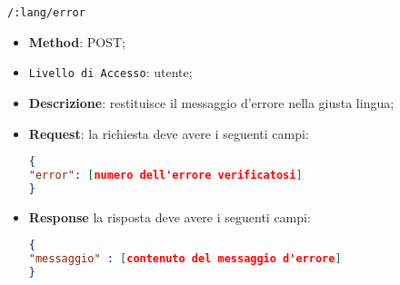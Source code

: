 	\item \texttt{/:lang/error}
		\begin{itemize}
			\item \textbf{Method}: POST;
			\item \texttt{Livello di Accesso}: utente;
			\item \textbf{Descrizione}: restituisce il messaggio d'errore nella giusta lingua;
			\item \textbf{Request}: la richiesta deve avere i seguenti campi:
\begin{lstlisting}[language=json,firstnumber=1]
{
"error": [numero dell'errore verificatosi]
}
\end{lstlisting}
			\item \textbf{Response} la risposta deve avere i seguenti campi:
\begin{lstlisting}[language=json,firstnumber=1]
{
"messaggio" : [contenuto del messaggio d'errore]
}
\end{lstlisting}
		\end{itemize}